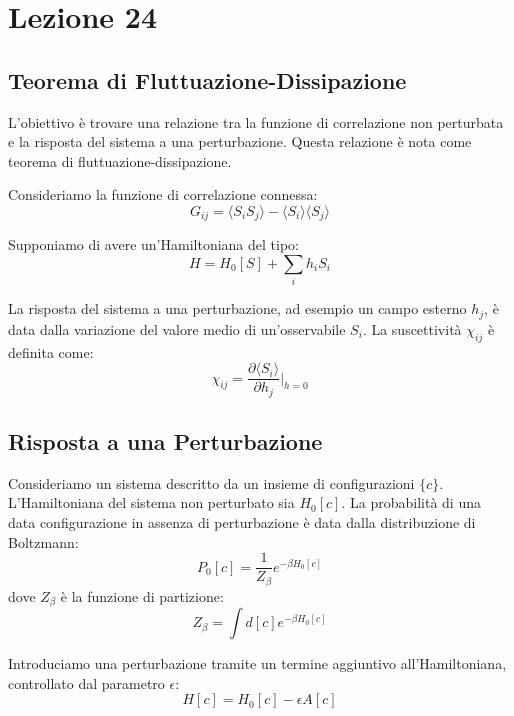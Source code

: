\chapter{Lezione 24}
\label{chap:lezione_24} %


\section{Teorema di Fluttuazione-Dissipazione}

L'obiettivo è trovare una relazione tra la funzione di correlazione non perturbata e la risposta del sistema a una perturbazione. Questa relazione è nota come teorema di fluttuazione-dissipazione.

Consideriamo la funzione di correlazione connessa:
\begin{equation}
 G_{ij} = \langle S_iS_j \rangle - \langle S_i \rangle\langle S_j \rangle
\end{equation}

Supponiamo di avere un'Hamiltoniana del tipo:
\begin{equation}
 H = H_0[S] + \sum_i h_iS_i
\end{equation}

La risposta del sistema a una perturbazione, ad esempio un campo esterno $h_j$, è data dalla variazione del valore medio di un'osservabile $S_i$. La suscettività $\chi_{ij}$ è definita come:
\begin{equation}
 \chi_{ij} = \frac{\partial \langle S_i \rangle}{\partial h_j} \bigg|_{h=0}
\end{equation}

\section{Risposta a una Perturbazione}

Consideriamo un sistema descritto da un insieme di configurazioni $\{c\}$. L'Hamiltoniana del sistema non perturbato sia $H_0[c]$. La probabilità di una data configurazione in assenza di perturbazione è data dalla distribuzione di Boltzmann:
\begin{equation}
 P_0[c] = \frac{1}{Z_\beta} e^{-\beta H_0[c]}
\end{equation}
dove $Z_\beta$ è la funzione di partizione:
\begin{equation}
 Z_\beta = \int d[c] e^{-\beta H_0[c]}
\end{equation}

Introduciamo una perturbazione tramite un termine aggiuntivo all'Hamiltoniana, controllato dal parametro $\epsilon$:
\begin{equation}
 H[c] = H_0[c] - \epsilon A[c]
\end{equation}

